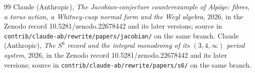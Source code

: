 \begin{thebibliography}{99}
 Claude (Anthropic), \emph{The Jacobian-conjecture counterexample of Alpöge: fibres, a torus action, a Whitney-cusp normal form and the Weyl algebra}, 2026, in the Zenodo record 10.5281/zenodo.22678442 and its later versions; source in \texttt{contrib/claude-ab/rewrite/papers/jacobian/} on the same branch.
 Claude (Anthropic), \emph{The $S^6$ record and the integral monodromy of its $(3,4,\infty)$ period system}, 2026, in the Zenodo record 10.5281/zenodo.22678442 and its later versions; source in \texttt{contrib/claude-ab/rewrite/papers/s6/} on the same branch.
\end{thebibliography}
